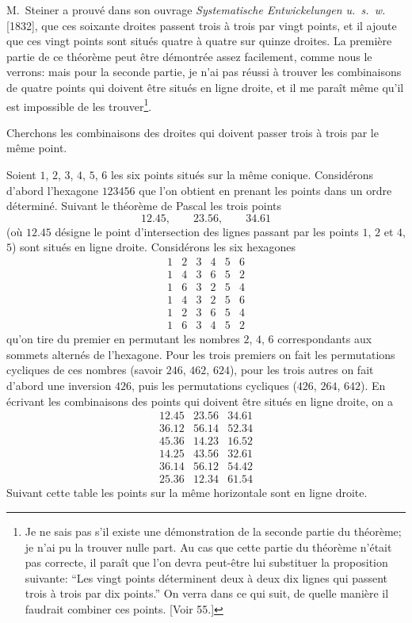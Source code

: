 \documentclass[11pt,a4paper]{book}
\begin{document}
M.~Steiner a prouv\'e dans son ouvrage \textit{Systematische Entwickelungen u.~s.~w.} [1832], que ces soixante droites passent trois \`a trois par vingt points, et il ajoute que ces vingt points sont situ\'es quatre \`a quatre sur quinze droites. La premi\`ere partie de ce th\'eor\`eme peut \^etre d\'emontr\'ee assez facilement, comme nous le verrons: mais pour la seconde partie, je n'ai pas r\'eussi \`a trouver les combinaisons de quatre points qui doivent \^etre situ\'es en ligne droite, et il me para\^it m\^eme qu'il est impossible de les trouver\footnote{Je ne sais pas s'il existe une d\'emonstration de la seconde partie du th\'eor\`eme; je n'ai pu la trouver nulle part. Au cas que cette partie du th\'eor\`eme n'\'etait pas correcte, il para\^it que l'on devra peut-\^etre lui substituer la proposition suivante: ``Les vingt points d\'eterminent deux \`a deux dix lignes qui passent trois \`a trois par dix points.'' On verra dans ce qui suit, de quelle mani\`ere il faudrait combiner ces points. [Voir 55.]}.

Cherchons les combinaisons des droites qui doivent passer trois \`a trois par le m\^eme point.

Soient $1$, $2$, $3$, $4$, $5$, $6$ les six points situ\'es sur la m\^eme conique. Consid\'erons d'abord l'hexagone $123456$ que l'on obtient en prenant les points dans un ordre d\'etermin\'e. Suivant le th\'eor\`eme de Pascal les trois points
\[
12.45,\qquad 23.56,\qquad 34.61
\]
(o\`u $12.45$ d\'esigne le point d'intersection des lignes passant par les points $1$, $2$ et $4$, $5$) sont situ\'es en ligne droite. Consid\'erons les six hexagones
\[
\begin{array}{cccccc}
1 & 2 & 3 & 4 & 5 & 6 \\
1 & 4 & 3 & 6 & 5 & 2 \\
1 & 6 & 3 & 2 & 5 & 4 \\
1 & 4 & 3 & 2 & 5 & 6 \\
1 & 2 & 3 & 6 & 5 & 4 \\
1 & 6 & 3 & 4 & 5 & 2
\end{array}
\]
qu'on tire du premier en permutant les nombres $2$, $4$, $6$ correspondants aux sommets altern\'es de l'hexagone. Pour les trois premiers on fait les permutations cycliques de ces nombres (savoir $246$, $462$, $624$), pour les trois autres on fait d'abord une inversion $426$, puis les permutations cycliques ($426$, $264$, $642$). En \'ecrivant les combinaisons des points qui doivent \^etre situ\'es en ligne droite, on a
\[
\begin{array}{ccc}
12.45 & 23.56 & 34.61 \\
36.12 & 56.14 & 52.34 \\
45.36 & 14.23 & 16.52 \\ \hline
14.25 & 43.56 & 32.61 \\
36.14 & 56.12 & 54.42 \\
25.36 & 12.34 & 61.54
\end{array}
\]
Suivant cette table les points sur la m\^eme horizontale sont en ligne droite.
\end{document}
